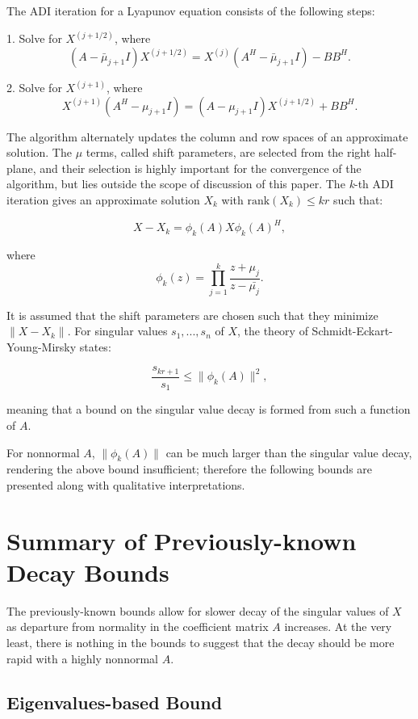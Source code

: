 \documentclass[12pt]{scrartcl}
\begin{document}
The ADI iteration for a Lyapunov equation consists of the following steps:


\hspace*{5mm} 1. Solve for $X^{(j+1/2)}$, where $$(A - \bar{\mu}_{j+1}I)X^{(j+1/2)} = X^{(j)}(A^{H}- \bar{\mu}_{j+1}I) - BB^{H}.$$

\hspace*{5mm} 2. Solve for $X^{(j+1)}$, where $$X^{(j+1)}(A^{H} - \mu_{j+1}I) = (A- \mu_{j+1}I)X^{(j+1/2)} + BB^{H}.$$

The algorithm alternately updates the column and row spaces of an approximate solution. The $\mu$ terms, called shift parameters, are selected from the right half-plane, and their selection is highly important for the convergence of the algorithm, but lies outside the scope of discussion of this paper. The \textit{k}-th ADI iteration gives an approximate solution $X_{k}$ with $\text{rank}(X_{k}) \leq kr $ such that: 

$$X-X_{k} = \phi_{k}(A)X \phi_{k} (A)^{H},$$

where $$\phi_{k}(z) = \prod_{j=1}^{k} \frac{z+\mu_{j}}{z-\bar{\mu_{j}}}.$$

It is assumed that the shift parameters are chosen such that they minimize $\|X-X_{k}\|$. For singular values $s_{1},...,s_{n}$ of $X$, the theory of Schmidt-Eckart-Young-Mirsky states:

$$\frac{s_{kr+1}}{s_{1}} \leq \| \phi_{k}(A) \|^{2},$$


meaning that a bound on the singular value decay is formed from such a function of $A$. 

For nonnormal $A$, $\| \phi_{k}(A) \| $ can be much larger than the singular value decay, rendering the above bound insufficient; therefore the following bounds are presented along with qualitative interpretations. 

\section{Summary of Previously-known Decay Bounds}

The previously-known bounds allow for slower decay of the singular values of $X$ as departure from normality in the coefficient matrix $A$ increases. At the very least, there is nothing in the bounds to suggest that the decay should be more rapid with a highly nonnormal $A$.

\subsection{Eigenvalues-based Bound}
\end{document}
